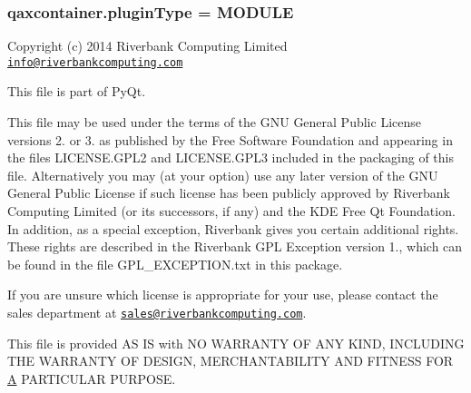\subsubsection[{plugin\+Type}]{\setlength{\rightskip}{0pt plus 5cm}qaxcontainer.\+plugin\+Type = M\+O\+D\+U\+L\+E}\label{namespaceqaxcontainer_aaa0bfc9154e9e76871b5e9b977f1af61}


Copyright (c) 2014 Riverbank Computing Limited \href{mailto:info@riverbankcomputing.com}{\tt info@riverbankcomputing.\+com} 

This file is part of Py\+Qt.

This file may be used under the terms of the G\+N\+U General Public License versions 2. or 3. as published by the Free Software Foundation and appearing in the files L\+I\+C\+E\+N\+S\+E.\+G\+P\+L2 and L\+I\+C\+E\+N\+S\+E.\+G\+P\+L3 included in the packaging of this file. Alternatively you may (at your option) use any later version of the G\+N\+U General Public License if such license has been publicly approved by Riverbank Computing Limited (or its successors, if any) and the K\+D\+E Free Qt Foundation. In addition, as a special exception, Riverbank gives you certain additional rights. These rights are described in the Riverbank G\+P\+L Exception version 1., which can be found in the file G\+P\+L\+\_\+\+E\+X\+C\+E\+P\+T\+I\+O\+N.\+txt in this package.

If you are unsure which license is appropriate for your use, please contact the sales department at \href{mailto:sales@riverbankcomputing.com}{\tt sales@riverbankcomputing.\+com}.

This file is provided A\+S I\+S with N\+O W\+A\+R\+R\+A\+N\+T\+Y O\+F A\+N\+Y K\+I\+N\+D, I\+N\+C\+L\+U\+D\+I\+N\+G T\+H\+E W\+A\+R\+R\+A\+N\+T\+Y O\+F D\+E\+S\+I\+G\+N, M\+E\+R\+C\+H\+A\+N\+T\+A\+B\+I\+L\+I\+T\+Y A\+N\+D F\+I\+T\+N\+E\+S\+S F\+O\+R \hyperlink{classA}{A} P\+A\+R\+T\+I\+C\+U\+L\+A\+R P\+U\+R\+P\+O\+S\+E. 